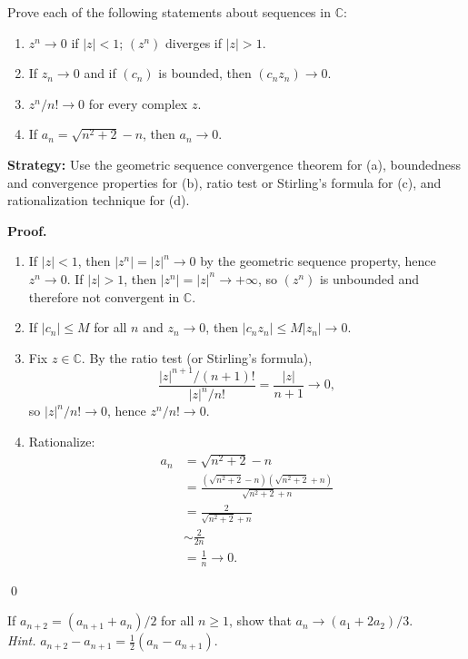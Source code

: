 \begin{problembox}
\begin{problemstatement}
Prove each of the following statements about sequences in $\mathbb{C}$:
\begin{enumerate}[label=(\alph*)]
\item $z^n \to 0$ if $|z| < 1$; $(z^n)$ diverges if $|z| > 1$.
\item If $z_n \to 0$ and if $(c_n)$ is bounded, then $(c_n z_n) \to 0$.
\item $z^n / n! \to 0$ for every complex $z$.
\item If $a_n = \sqrt{n^2 + 2} - n$, then $a_n \to 0$.
\end{enumerate}
\end{problemstatement}
\end{problembox}

\noindent\textbf{Strategy:} Use the geometric sequence convergence theorem for (a), boundedness and convergence properties for (b), ratio test or Stirling's formula for (c), and rationalization technique for (d).

\noindent\textbf{Proof.}
\begin{enumerate}[label=(\alph*)]
\item If $|z|<1$, then $|z^n|=|z|^n\to 0$ by the geometric sequence property, hence $z^n\to 0$. If $|z|>1$, then $|z^n|=|z|^n\to +\infty$, so $(z^n)$ is unbounded and therefore not convergent in $\mathbb{C}$.
\item If $|c_n|\le M$ for all $n$ and $z_n\to 0$, then $|c_n z_n|\le M|z_n|\to 0$.
\item Fix $z\in\mathbb{C}$. By the ratio test (or Stirling's formula),
\[
\frac{|z|^{n+1}/(n+1)!}{|z|^n/n!}=\frac{|z|}{n+1}\to 0,
\]
so $|z|^n/n!\to 0$, hence $z^n/n!\to 0$.
\item Rationalize:
\begin{align*}
a_n&=\sqrt{n^2+2}-n\\
&=\frac{(\sqrt{n^2+2}-n)(\sqrt{n^2+2}+n)}{\sqrt{n^2+2}+n}\\
&=\frac{2}{\sqrt{n^2+2}+n}\\
&\sim \frac{2}{2n}\\
&=\frac{1}{n}\to 0.
\end{align*}
\end{enumerate}\qed
\medskip



\begin{problembox}
\begin{problemstatement}
If $a_{n+2} = (a_{n+1} + a_n)/2$ for all $n \geq 1$, show that $a_n \to (a_1 + 2a_2)/3$. \\
\textit{Hint.} $a_{n+2} - a_{n+1} = \frac{1}{2}(a_n - a_{n+1})$.
\end{problemstatement}
\end{problembox}

